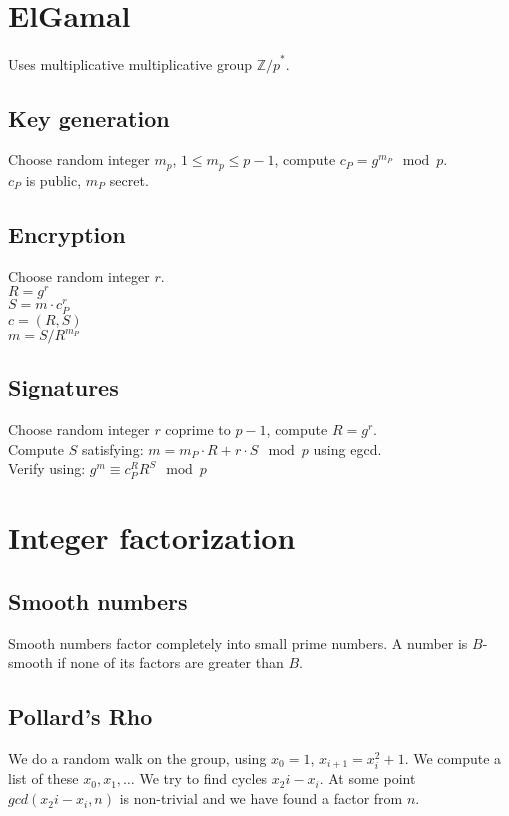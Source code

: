 \documentclass{article}
\begin{document}
\section{ElGamal}
Uses multiplicative multiplicative group ${\mathbb{Z}/p}^{*}$.
\subsection{Key generation}
Choose random integer $m_p$, $1 \leq m_p \leq p-1$, compute $c_P=g^{m_P} \mod p$. \\
$c_P$ is public, $m_P$ secret.

\subsection{Encryption}
Choose random integer $r$. \\
$R=g^r$ \\
$S=m \cdot c_P^r$ \\
$c=(R,S)$ \\
$m=S/R^{m_P}$ \\

\subsection{Signatures}
Choose random integer $r$ coprime to $p-1$, compute $R=g^r$. \\
Compute $S$ satisfying:
$m=m_P \cdot R + r \cdot S \mod p$ 
using egcd. \\
Verify using:
$g^m \equiv c_P^R R^S \mod p$ \\

\section{Integer factorization}
\subsection{Smooth numbers}
Smooth numbers factor completely into small prime numbers. A number is $B$-smooth if none of its factors are greater than $B$.

\subsection{Pollard's Rho}
We do a random walk on the group, using $x_0=1$, $x_{i+1} = x_i^2 + 1$.
We compute a list of these ${x_0, x_1, \ldots }$
We try to find cycles $x_2i - x_i$.
At some point $gcd(x_2i - x_i, n)$ is non-trivial and we have found a factor from $n$.
\end{document}
